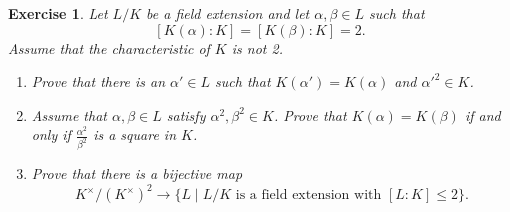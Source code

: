 \documentclass[a4paper,10pt,reqno]{amsart}
\newtheorem{ex}{Exercise}[section]
\begin{document}
\begin{ex}
    Let $L/K$ be a field extension and let $\alpha, \beta\in L$ such that 
    \[
    [K(\alpha):K]=[K(\beta):K]=2.
    \]
    Assume that the characteristic of $K$ is not 2.
    \begin{enumerate}[label=(\roman*)]
    \item Prove that there is an $\alpha' \in L$ such that $K(\alpha') = K(\alpha)$ and $\alpha'^2 \in K$.
    \item Assume that $\alpha,\beta \in L$ satisfy $\alpha^2,\beta^2 \in K$. Prove that $K(\alpha)=K(\beta)$ if and only if $\frac{\alpha^2}{\beta^2}$ is a square in $K$.
    \item Prove that there is a bijective map 
    \[
    K^\times/(K^\times)^2\longrightarrow \{L\mid L/K \text{ is a field extension with } [L:K] \leq 2\}.
    \]
\end{enumerate}    
\end{ex}
\end{document}
